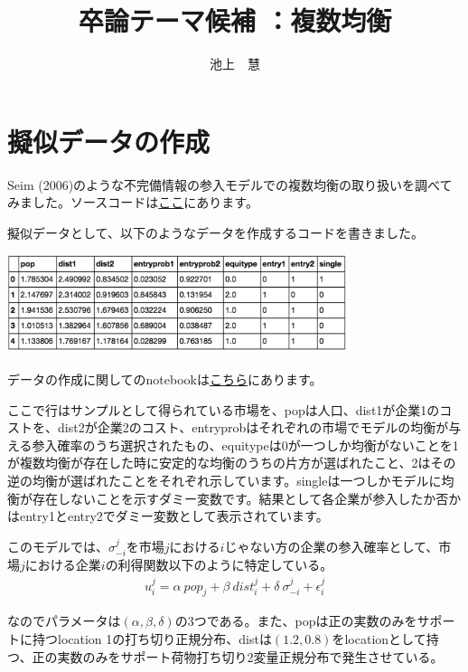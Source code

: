 \documentclass{jsarticle}
\begin{document}
\title{卒論テーマ候補 ：複数均衡}
\author{池上　慧}
\maketitle

\section{擬似データの作成}
Seim (2006)のような不完備情報の参入モデルでの複数均衡の取り扱いを調べてみました。ソースコードは\href{https://github.com/keiikegami/multiplicity}{ここ}にあります。

擬似データとして、以下のようなデータを作成するコードを書きました。
\begin{center}
\includegraphics[width=10cm]{table1.png}
\end{center}
データの作成に関してのnotebookは\href{https://github.com/keiikegami/multiplicity/blob/master/sample_data_generation.ipynb}{こちら}にあります。

ここで行はサンプルとして得られている市場を、popは人口、dist1が企業1のコストを、dist2が企業2のコスト、entryprobはそれぞれの市場でモデルの均衡が与える参入確率のうち選択されたもの、equitypeは0が一つしか均衡がないことを1が複数均衡が存在した時に安定的な均衡のうちの片方が選ばれたこと、2はその逆の均衡が選ばれたことをそれぞれ示しています。singleは一つしかモデルに均衡が存在しないことを示すダミー変数です。結果として各企業が参入したか否かはentry1とentry2でダミー変数として表示されています。

このモデルでは、$\sigma_{-i}^j$を市場$j$における$i$じゃない方の企業の参入確率として、市場$j$における企業$i$の利得関数以下のように特定している。
\begin{align}
	u_i^j = \alpha\ pop_j + \beta\ dist_i^j + \delta\  \sigma_{-i}^{j} + \epsilon_i^j
\end{align}

なのでパラメータは$(\alpha, \beta, \delta)$の3つである。また、popは正の実数のみをサポートに持つlocation 1の打ち切り正規分布、distは$(1.2, 0.8)$をlocationとして持つ、正の実数のみをサポート荷物打ち切り2変量正規分布で発生させている。
\end{document}
